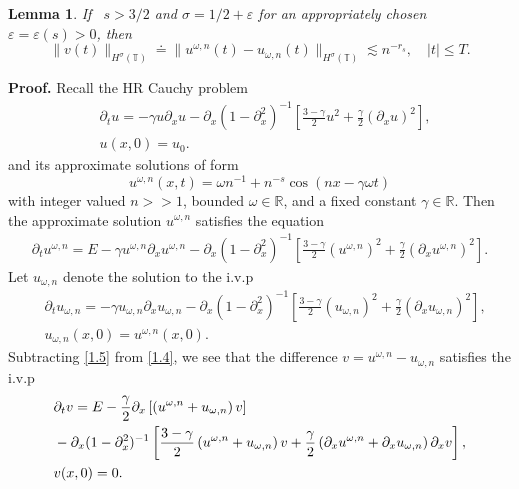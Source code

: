 \documentclass[12pt,reqno]{amsart}
\newcommand{\rr}{\mathbb{R}}
\newcommand{\p}{\partial}
\newcommand{\ci}{\mathbb{T}}
\newcommand{\ee}{\varepsilon}
\theoremstyle{plain}  %
\newtheorem{lemma}{Lemma}
\theoremstyle{definition}
\begin{document}
\begin{lemma}
	\label{lem:bound_for_difference-of-approx-actual-soln}
	If \ $s > 3/2 $ and $\sigma = 1/2 + \ee$ for an appropriately
	chosen $\ee = \ee(s) > 0$, then 
			\begin{equation} 
				\|
				v(t)
				\|_{H^\sigma(\ci)}
				\doteq
				\label{differ-Hsigma-est} 
				\|
				u^{\omega, n}(t) 
				- 
				u_{\omega, n}(t)
				\|_{H^\sigma(\ci)}
				\lesssim 
				n^{-r_s}, 
				\quad
				|t| \le T.
			\end{equation}
			\end{lemma}
{\bf{Proof.}} Recall the HR Cauchy problem
\begin{align}
	\label{1.1}
	&\p_t u  = -\gamma u \p_x u - \p_x\left( 1-\p_x^2
		\right)^{-1}\left[ \frac{3-\gamma}{2}
		u^2 + \frac{\gamma}{2}\left( \p_x
		u
		\right)^2 \right],
		\\
		\label{1.2}
		& u(x,0) = u_0.
\end{align}
and its approximate solutions of form
	\begin{equation}
		\label{approx-solns-form}
		u^{\omega,n}(x,t) = \omega n^{-1} + n^{-s} \cos \left( nx - \gamma \omega t
		\right) 
	\end{equation}
	with integer valued $n >>1$, bounded $\omega \in \rr$, and a fixed 
	constant $\gamma \in \rr$.	Then the approximate solution 
	$u^{\omega,n}$ satisfies the equation
\begin{equation}
	\begin{split}
		\label{1.4}
		\p_t u^{\omega,n} = E - \gamma u^{\omega,n} \p_x u^{\omega,n} 
		- \p_x\left( 1-\p_x^2 \right)^{-1} \left[
		\frac{3-\gamma}{2} \left( u^{\omega,n} \right)^2 +
		\frac{\gamma}{2}\left( \p_x u^{\omega,n} \right)^2 \right].
	\end{split}
\end{equation}
Let $u_{\omega,n}$ denote the solution to the i.v.p
\begin{align}
	\label{1.5}
	&\p_t u_{\omega,n}  = -\gamma u_{\omega,n} \p_x u_{\omega,n} - 
	\p_x\left( 1-\p_x^2
		\right)^{-1}\left[ \frac{3-\gamma}{2}\left(
		u_{\omega,n} \right)^2 + \frac{\gamma}{2}\left( \p_x
		u_{\omega,n}
		\right)^2 \right],
		\\
		& u_{\omega,n}(x,0) = u^{\omega,n}(x,0).
\end{align}
Subtracting \eqref{1.5} from \eqref{1.4}, we see that the
difference $v = u^{\omega,n} - u_{\omega,n}$ satisfies the i.v.p
\begin{align}
		\label{1.7}
		& \p_t v  =  E - \frac{\gamma}{2} \p_x
		\left[ \left( u^{\omega,n} + u_{\omega,n} \right)v \right]
		 \notag
		\\
		& - \p_x(1-\p_x^2)^{-1} \left[
		\frac{3-\gamma}{2} \left( u^{\omega,n} + u_{\omega,n}
		\right) v +
		\frac{\gamma}{2}\left( \p_x u^{\omega,n} +
		\p_x u_{\omega,n}
		\right) \p_x v
		\right], 
		\\
		& v(x,0)=0.
\end{align}
\end{document}
